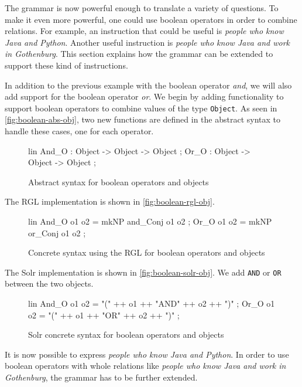 The grammar is now powerful enough to translate a variety of questions. To make it even more powerful, one could use boolean operators in order to combine relations. For example, an instruction that could be useful is \emph{people who know Java and Python}. Another useful instruction is \emph{people who know Java and work in Gothenburg}. This section explains how the grammar can be extended to support these kind of instructions.

In addition to the previous example with the boolean operator \emph{and}, we will also add support for the boolean operator \emph{or}. We begin by adding functionality to support boolean operators to combine values of the type \texttt{Object}. As seen in \autoref{fig:boolean-abs-obj}, two new functions are defined in the abstract syntax to handle these cases, one for each operator.

\begin{figure}[H]
\begin{code}
lin
  And_O : Object -> Object -> Object ;
  Or_O : Object -> Object -> Object ;
\end{code}
\caption{Abstract syntax for boolean operators and objects\label{fig:boolean-abs-obj}}
\end{figure}

The RGL implementation is shown in \autoref{fig:boolean-rgl-obj}.

\begin{figure}[H]
\begin{code}
lin
  And_O o1 o2 = mkNP and_Conj o1 o2 ;
  Or_O o1 o2 = mkNP or_Conj o1 o2 ;
\end{code}
\caption{Concrete syntax using the RGL for boolean operators and objects\label{fig:boolean-rgl-obj}}
\end{figure}

The Solr implementation is shown in \autoref{fig:boolean-solr-obj}. We add \texttt{AND} or \texttt{OR} between the two objects.

\begin{figure}[H]
\begin{code}
lin
  And_O o1 o2 = "(" ++ o1 ++ "AND" ++ o2 ++ ")" ;
  Or_O o1 o2 = "(" ++ o1 ++ "OR" ++ o2 ++ ")" ;
\end{code}
\caption{Solr concrete syntax for boolean operators and objects\label{fig:boolean-solr-obj}}
\end{figure}

It is now possible to express \emph{people who know Java and Python}. In order to use boolean operators with whole relations like \emph{people who know Java and work in Gothenburg}, the grammar has to be further extended.

